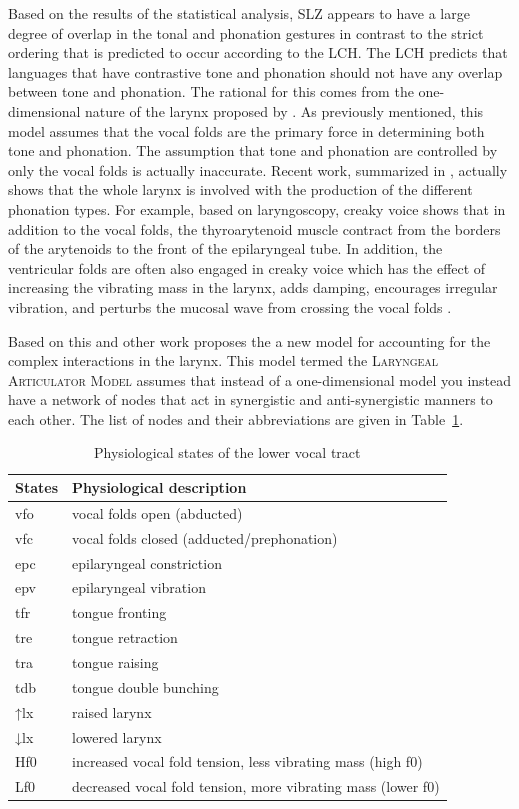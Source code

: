 \documentclass[12pt, letterpaper]{article}
\providecommand{\lsptoprule}{\midrule\toprule}
\providecommand{\lspbottomrule}{\bottomrule\midrule}
\begin{document}
Based on the results of the statistical analysis, SLZ appears to have a large degree of overlap in the tonal and phonation gestures in contrast to the strict ordering that is predicted to occur according to the LCH. The LCH predicts that languages that have contrastive tone and phonation should not have any overlap between tone and phonation. The rational for this comes from the one-dimensional nature of the larynx proposed by \citet{ladefogedPreliminariesLinguisticPhonetics1971}. As previously mentioned, this model assumes that the vocal folds are the primary force in determining both tone and phonation. The assumption that tone and phonation are controlled by only the vocal folds is actually inaccurate. Recent work, summarized in \citet{eslingVoiceQualityLaryngeal2019}, actually shows that the whole larynx is involved with the production of the different phonation types. For example, based on laryngoscopy, creaky voice shows that in addition to the vocal folds, the thyroarytenoid muscle contract from the borders of the arytenoids to the front of the epilaryngeal tube. In addition, the ventricular folds are often also engaged in creaky voice which has the effect of increasing the vibrating mass in the larynx, adds damping, encourages irregular vibration, and perturbs the mucosal wave from crossing the vocal folds \citep{moisikModelingBiomechanicalInfluence2014}. 

Based on this and other work \citet{eslingVoiceQualityLaryngeal2019} proposes the a new model for accounting for the complex interactions in the larynx. This model termed the \textsc{Laryngeal Articulator Model} assumes that instead of a one-dimensional model you instead have a network of nodes that act in synergistic and anti-synergistic manners to each other. The list of nodes and their abbreviations are given in Table~\ref{tab:States}.
\begin{table}[!ht]
	\centering
	\caption{Physiological states of the lower vocal tract}
	\label{tab:States}
	 \begin{tabular}{ll}
	  \lsptoprule
	  States	&	 Physiological description \\
	  \hline
	  vfo   	&  vocal folds open (abducted) \\
		vfc    	&  vocal folds closed (adducted/prephonation)\\
		epc   	&  epilaryngeal constriction\\
		epv			&  epilaryngeal vibration \\
		tfr 		&  tongue fronting \\
		tre 		&  tongue retraction \\
		tra 		&  tongue raising \\
		tdb 		&	 tongue double bunching\\
		↑lx     &  raised larynx\\
		↓lx			&  lowered larynx\\
		Hf0			&  increased vocal fold tension, less vibrating mass (high f0)\\
		Lf0			&  decreased vocal fold tension, more vibrating mass (lower f0)\\
	  \lspbottomrule
	 \end{tabular}
\end{table}
\end{document}
